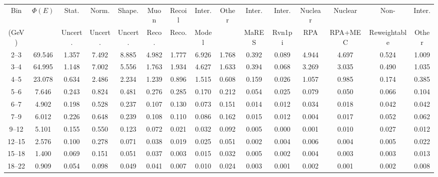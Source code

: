 \begin{turnpage}
\begin{table}[hpt]
   \setlength{\tabcolsep}{4pt}
    \begin{tabular}{ccccc|cccc|cccccc}
    \hline
 Bin & $\Phi(E)$ & 	 Stat.  & 	 Norm. & 	 Shape. & 	 Muon  & 	 Recoil  & 	 Inter.  & 	 Other & Inter. &  	 Inter. &  	 Nuclear &  	 Nuclear &  	 Non- &  	 Inter. \\
 (GeV) 	    &                  & 	Uncert.  & 	 Uncert. & 	 Uncert. 	& 	  Reco. & 	 Reco.  & 	  Model & 	 & MaRES &  Rvn1pi &  	 RPA &  	 RPA+MEC &  	 Reweightable & Other \\
    \hline
  2--3 &  	 69.546 &  	 1.357 &  	 7.492 &  	 8.885 &  	 4.982 &  	 1.777 &  	 6.926 &  	 1.768 &  	 0.392 &  	 0.089 &  	 4.944 &  	 4.697 &  	 0.524 &  	 1.009 \\ 
  3--4 &  	 64.995 &  	 1.148 &  	 7.002 &  	 5.556 &  	 1.763 &  	 1.934 &  	 4.627 &  	 1.633 &  	 0.394 &  	 0.068 &  	 3.269 &  	 3.035 &  	 0.490 &  	 1.035 \\ 
  4--5 &  	 23.078 &  	 0.634 &  	 2.486 &  	 2.234 &  	 1.239 &  	 0.896 &  	 1.515 &  	 0.608 &  	 0.159 &  	 0.026 &  	 1.057 &  	 0.985 &  	 0.174 &  	 0.385 \\ 
  5--6 &  	 7.646 &  	 0.243 &  	 0.824 &  	 0.481 &  	 0.276 &  	 0.285 &  	 0.170 &  	 0.212 &  	 0.054 &  	 0.025 &  	 0.079 &  	 0.050 &  	 0.066 &  	 0.104 \\ 
  6--7 &  	 4.902 &  	 0.198 &  	 0.528 &  	 0.237 &  	 0.107 &  	 0.130 &  	 0.073 &  	 0.151 &  	 0.014 &  	 0.012 &  	 0.034 &  	 0.018 &  	 0.042 &  	 0.042 \\ 
  7--9 &  	 6.012 &  	 0.226 &  	 0.648 &  	 0.239 &  	 0.108 &  	 0.110 &  	 0.086 &  	 0.162 &  	 0.015 &  	 0.012 &  	 0.004 &  	 0.017 &  	 0.052 &  	 0.062 \\ 
  9--12 &  	 5.101 &  	 0.155 &  	 0.550 &  	 0.123 &  	 0.072 &  	 0.021 &  	 0.032 &  	 0.092 &  	 0.005 &  	 0.000 &  	 0.001 &  	 0.010 &  	 0.027 &  	 0.012 \\ 
  12--15 &  	 2.576 &  	 0.100 &  	 0.278 &  	 0.071 &  	 0.038 &  	 0.019 &  	 0.025 &  	 0.051 &  	 0.002 &  	 0.004 &  	 0.006 &  	 0.004 &  	 0.005 &  	 0.022 \\ 
  15--18 &  	 1.400 &  	 0.069 &  	 0.151 &  	 0.051 &  	 0.037 &  	 0.003 &  	 0.015 &  	 0.032 &  	 0.005 &  	 0.002 &  	 0.004 &  	 0.003 &  	 0.003 &  	 0.013 \\ 
  18--22 &  	 0.909 &  	 0.054 &  	 0.098 &  	 0.049 &  	 0.041 &  	 0.007 &  	 0.010 &  	 0.024 &  	 0.003 &  	 0.001 &  	 0.002 &  	 0.001 &  	 0.002 &  	 0.008 \\ 

\end{tabular}
\end{table}
\end{turnpage}
